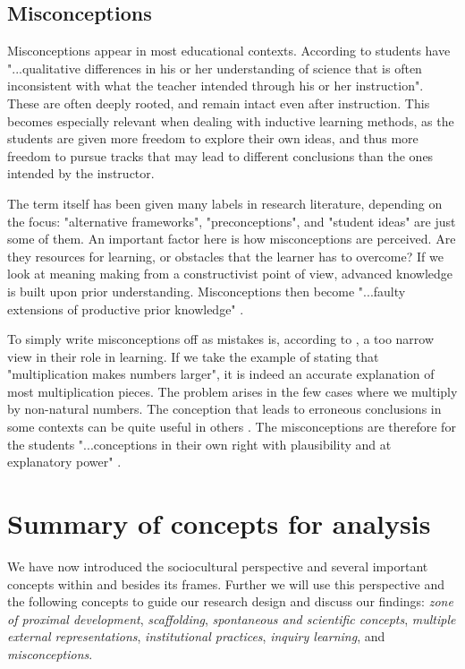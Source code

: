 \subsection{Misconceptions}
Misconceptions appear in most educational contexts. According to \citet[p. 437]{gomez2008elementary} students have "...qualitative differences in his or her understanding of science that is often inconsistent with what the teacher intended through his or her instruction". These are often deeply rooted, and remain intact even after instruction. This becomes especially relevant when dealing with inductive learning methods, as the students are given more freedom to explore their own ideas, and thus more freedom to pursue tracks that may lead to different conclusions than the ones intended by the instructor.

The term itself has been given many labels in research literature, depending on the focus: "alternative frameworks", "preconceptions", and "student ideas" are just some of them. An important factor here is how misconceptions are perceived. Are they resources for learning, or obstacles that the learner has to overcome? If we look at meaning making from a constructivist point of view, advanced knowledge is built upon prior understanding. Misconceptions then become "...faulty extensions of productive prior knowledge" \citep[p. 152]{smith1994misconceptions}.

To simply write misconceptions off as mistakes is, according to \citet{smith1994misconceptions}, a too narrow view in their role in learning. If we take the example of stating that "multiplication makes numbers larger", it is indeed an accurate explanation of most multiplication pieces. The problem arises in the few cases where we multiply by non-natural numbers. The conception that leads to erroneous conclusions in some contexts can be quite useful in others \citep{smith1994misconceptions}. The misconceptions are therefore for the students "...conceptions in their own right with plausibility and at explanatory power" \citetext{\citealp{smith1994misconceptions}, referenced in \citealp{larkin2012misconceptions}, p. 928}. 


\section{Summary of concepts for analysis}
We have now introduced the sociocultural perspective and several important concepts within and besides its frames. Further we will use this perspective and the following concepts to guide our research design and discuss our findings: \emph{zone of proximal development}, \emph{scaffolding}, \emph{spontaneous and scientific concepts}, \emph{multiple external representations}, \emph{institutional practices}, \emph{inquiry learning}, and \emph{misconceptions}.
